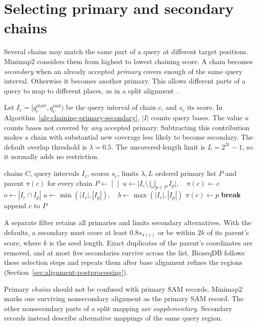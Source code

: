 \clearpage
\section{Selecting primary and secondary chains}
\label{sec:chaining-primary-secondary}

Several chains may match the same part of a query at different target positions.
Minimap2 considers them from highest to lowest chaining score. A chain becomes
\emph{secondary} when an already accepted \emph{primary} covers enough of the
same query interval. Otherwise it becomes another primary. This allows
different parts of a query to map to different places, as in a split
alignment~\cite{minimap2_paper,minimap2_software}.

Let \(I_c=[q_c^{\mathrm{start}},q_c^{\mathrm{end}})\) be the query interval
of chain \(c\), and \(s_c\) its score. In
Algorithm~\ref{alg:chaining-primary-secondary}, \(|I|\) counts query bases.
The value \(u\) counts bases not covered by \emph{any} accepted primary.
Subtracting this contribution makes a chain with substantial new coverage
less likely to become secondary. The default overlap threshold is
\(\lambda=0.5\). The uncovered-length limit is \(L=2^{31}-1\), so it
normally adds no restriction.

\begin{algorithm}[H]
\caption{Minimap2 primary and secondary chain selection}
\label{alg:chaining-primary-secondary}
\small
\begin{algorithmic}[1]
  \Require chains \(C\), query intervals \(I_c\), scores \(s_c\), limits \(\lambda,L\)
  \Ensure ordered primary list \(P\) and parent \(\pi(c)\) for every chain
  \State \(P\gets[\,]\)
    \State \(u\gets\bigl|I_c\setminus\bigcup_{p\in P}I_p\bigr|,\quad \pi(c)\gets c\)
      \State \(o\gets|I_c\cap I_p|\)
      \State \(a\gets\min(|I_c|,|I_p|),\quad b\gets\max(|I_c|,|I_p|)\)
        \State \(\pi(c)\gets p\) 
        \State \textbf{break}
      \EndIf
    \EndFor
      \State append \(c\) to \(P\)
    \EndIf
  \EndFor
\end{algorithmic}
\end{algorithm}

A separate filter retains all primaries and limits secondary alternatives.
With the defaults, a secondary must score at least \(0.8s_{\pi(c)}\) or be
within \(2k\) of its parent's score, where \(k\) is the seed length.
Exact duplicates of the parent's coordinates are removed, and at most five
secondaries survive across the list. BioseqDB follows these selection steps
and repeats them after base alignment refines the regions
(Section~\ref{sec:alignment-postprocessing}).

Primary \emph{chains} should not be confused with primary SAM records.
Minimap2 marks one surviving nonsecondary alignment as the primary SAM record.
The other nonsecondary parts of a split mapping are \emph{supplementary}.
Secondary records instead describe alternative mappings of the same query
region.
\clearpage
